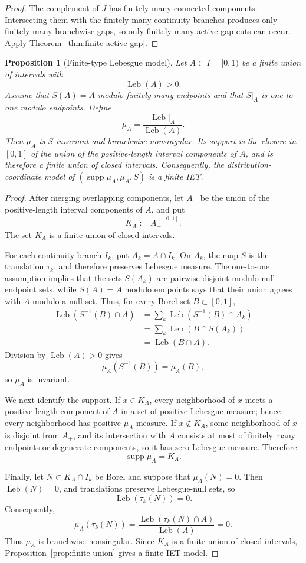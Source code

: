 \documentclass[11pt]{amsart}
\theoremstyle{plain}
\newtheorem{proposition}[theorem]{Proposition}
\theoremstyle{definition}
\theoremstyle{remark}
\DeclareMathOperator{\supp}{supp}
\DeclareMathOperator{\Leb}{Leb}
\begin{document}
\begin{proof}
The complement of \(J\) has finitely many connected components. Intersecting them with the
finitely many continuity branches produces only finitely many branchwise gaps, so only
finitely many active-gap cuts can occur. Apply Theorem~\ref{thm:finite-active-gap}.
\end{proof}

\begin{proposition}[Finite-type Lebesgue model]\label{prop:finite-type-lebesgue}
Let \(A\subset I=[0,1)\) be a finite union of intervals with
\[
        \Leb(A)>0.
\]
Assume that \(S(A)=A\) modulo finitely many endpoints and that \(S|_A\) is one-to-one
modulo endpoints. Define
\[
        \mu_A=\frac{\Leb|_A}{\Leb(A)}.
\]
Then \(\mu_A\) is \(S\)-invariant and branchwise nonsingular. Its support is the closure in
\([0,1]\) of the union of the positive-length interval components of \(A\), and is therefore
a finite union of closed intervals. Consequently, the distribution-coordinate model of
\((\supp\mu_A,\mu_A,S)\) is a finite IET.
\end{proposition}

\begin{proof}
After merging overlapping components, let \(A_+\) be the union of the positive-length
interval components of \(A\), and put
\[
        K_A:=\overline{A_+}^{\,[0,1]}.
\]
The set \(K_A\) is a finite union of closed intervals.

For each continuity branch \(I_k\), put \(A_k=A\cap I_k\). On \(A_k\), the map \(S\) is
the translation \(\tau_k\), and therefore preserves Lebesgue measure. The one-to-one
assumption implies that the sets \(S(A_k)\) are pairwise disjoint modulo null endpoint sets,
while \(S(A)=A\) modulo endpoints says that their union agrees with \(A\) modulo a null set.
Thus, for every Borel set \(B\subset[0,1]\),
\[
\begin{aligned}
\Leb(S^{-1}(B)\cap A)
&=
\sum_k\Leb(S^{-1}(B)\cap A_k)\\
&=
\sum_k\Leb(B\cap S(A_k))\\
&=
\Leb(B\cap A).
\end{aligned}
\]
Division by \(\Leb(A)>0\) gives
\[
        \mu_A(S^{-1}(B))=\mu_A(B),
\]
so \(\mu_A\) is invariant.

We next identify the support. If \(x\in K_A\), every neighborhood of \(x\) meets a
positive-length component of \(A\) in a set of positive Lebesgue measure; hence every
neighborhood has positive \(\mu_A\)-measure. If \(x\notin K_A\), some neighborhood of
\(x\) is disjoint from \(A_+\), and its intersection with \(A\) consists at most of finitely
many endpoints or degenerate components, so it has zero Lebesgue measure. Therefore
\[
        \supp\mu_A=K_A.
\]

Finally, let \(N\subset K_A\cap I_k\) be Borel and suppose that \(\mu_A(N)=0\). Then
\(\Leb(N)=0\), and translations preserve Lebesgue-null sets, so
\[
        \Leb(\tau_k(N))=0.
\]
Consequently,
\[
        \mu_A(\tau_k(N))
        =
        \frac{\Leb(\tau_k(N)\cap A)}{\Leb(A)}
        =0.
\]
Thus \(\mu_A\) is branchwise nonsingular. Since \(K_A\) is a finite union of closed
intervals, Proposition~\ref{prop:finite-union} gives a finite IET model.
\end{proof}
\end{document}
